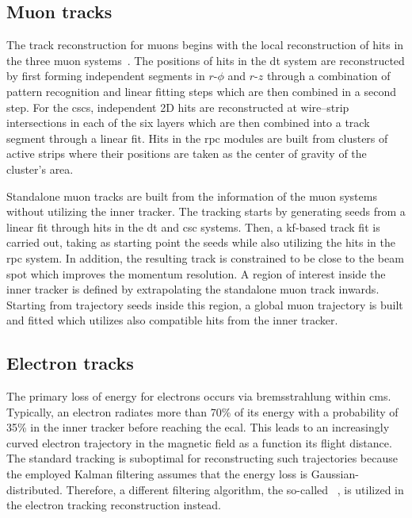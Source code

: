 \subsection{Muon tracks}
\label{sec:reconstruction-muontracks}

The track reconstruction for muons begins with the local reconstruction of hits in the three muon systems~\cite{Bayatian:922757}. The positions of hits in the \gls{dt} system are reconstructed by first forming independent segments in $r\text{-}\phi$ and $r\text{-}z$ through a combination of pattern recognition and linear fitting steps which are then combined in a second step. For the \glspl{csc}, independent 2D hits are reconstructed at wire--strip intersections in each of the six layers which are then combined into a track segment through a linear fit. Hits in the \gls{rpc} modules are built from clusters of active strips where their positions are taken as the center of gravity of the cluster's area.

Standalone muon tracks are built from the information of the muon systems without utilizing the inner tracker. The tracking starts by generating seeds from a linear fit through hits in the \gls{dt} and \gls{csc} systems. Then, a \gls{kf}-based track fit is carried out, taking as starting point the seeds while also utilizing the hits in the \gls{rpc} system. In addition, the resulting track is constrained to be close to the beam spot which improves the momentum resolution. A region of interest inside the inner tracker is defined by extrapolating the standalone muon track inwards. Starting from trajectory seeds inside this region, a global muon trajectory is built and fitted which utilizes also compatible hits from the inner tracker.


\subsection{Electron tracks}
\label{sec:reconstruction-electrontracks}

The primary loss of energy for electrons occurs via bremsstrahlung within \gls{cms}. Typically, an electron radiates more than 70\% of its energy with a probability of 35\% in the inner tracker before reaching the \gls{ecal}. This leads to an increasingly curved electron trajectory in the magnetic field as a function its flight distance. The standard tracking is suboptimal for reconstructing such trajectories because the employed Kalman filtering assumes that the energy loss is Gaussian-distributed. Therefore, a different filtering algorithm, the so-called ~\cite{0954-3899-31-9-N01}, is utilized in the electron tracking reconstruction instead.

